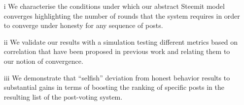 \begin{itemize}
\item[i] We characterise the conditions under which our abstract Steemit model converges highlighting the number of rounds that the system requires in order to converge under honesty for any sequence of posts. 
\item[ii]
We validate our results with a simulation testing different metrics based on  correlation that have been proposed in previous work and relating them to our notion of convergence. 
\item[iii]
We demonstrate that ``selfish''  deviation from honest behavior results to substantial gains in terms of boosting the ranking of specific posts  in the resulting list of the post-voting system. 
\end{itemize}






